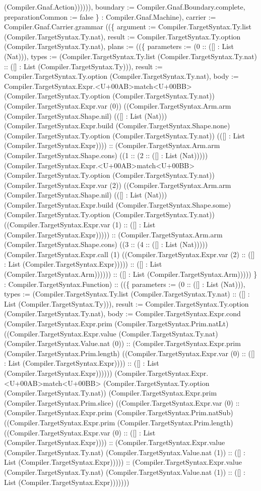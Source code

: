 \documentclass[11pt]{article}
\begin{document}
(Compiler.Gnaf.Action)))))), boundary := Compiler.Gnaf.Boundary.complete, preparationCommon := false \} : Compiler.Gnaf.Machine), carrier := Compiler.Gnaf.Carrier.grammar ((\{ argument := Compiler.TargetSyntax.Ty.list (Compiler.TargetSyntax.Ty.nat), result := Compiler.TargetSyntax.Ty.option (Compiler.TargetSyntax.Ty.nat), plans := ((\{ parameters := (0 :: ([] : List (Nat))), types := (Compiler.TargetSyntax.Ty.list (Compiler.TargetSyntax.Ty.nat) :: ([] : List (Compiler.TargetSyntax.Ty))), result := Compiler.TargetSyntax.Ty.option (Compiler.TargetSyntax.Ty.nat), body := Compiler.TargetSyntax.Expr.<U+00AB>match<U+00BB> (Compiler.TargetSyntax.Ty.option (Compiler.TargetSyntax.Ty.nat)) (Compiler.TargetSyntax.Expr.var (0)) ((Compiler.TargetSyntax.Arm.arm (Compiler.TargetSyntax.Shape.nil) (([] : List (Nat))) (Compiler.TargetSyntax.Expr.build (Compiler.TargetSyntax.Shape.none) (Compiler.TargetSyntax.Ty.option (Compiler.TargetSyntax.Ty.nat)) (([] : List (Compiler.TargetSyntax.Expr)))) :: (Compiler.TargetSyntax.Arm.arm (Compiler.TargetSyntax.Shape.cons) ((1 :: (2 :: ([] : List (Nat))))) (Compiler.TargetSyntax.Expr.<U+00AB>match<U+00BB> (Compiler.TargetSyntax.Ty.option (Compiler.TargetSyntax.Ty.nat)) (Compiler.TargetSyntax.Expr.var (2)) ((Compiler.TargetSyntax.Arm.arm (Compiler.TargetSyntax.Shape.nil) (([] : List (Nat))) (Compiler.TargetSyntax.Expr.build (Compiler.TargetSyntax.Shape.some) (Compiler.TargetSyntax.Ty.option (Compiler.TargetSyntax.Ty.nat)) ((Compiler.TargetSyntax.Expr.var (1) :: ([] : List (Compiler.TargetSyntax.Expr))))) :: (Compiler.TargetSyntax.Arm.arm (Compiler.TargetSyntax.Shape.cons) ((3 :: (4 :: ([] : List (Nat))))) (Compiler.TargetSyntax.Expr.call (1) ((Compiler.TargetSyntax.Expr.var (2) :: ([] : List (Compiler.TargetSyntax.Expr))))) :: ([] : List (Compiler.TargetSyntax.Arm)))))) :: ([] : List (Compiler.TargetSyntax.Arm))))) \} : Compiler.TargetSyntax.Function) :: ((\{ parameters := (0 :: ([] : List (Nat))), types := (Compiler.TargetSyntax.Ty.list (Compiler.TargetSyntax.Ty.nat) :: ([] : List (Compiler.TargetSyntax.Ty))), result := Compiler.TargetSyntax.Ty.option (Compiler.TargetSyntax.Ty.nat), body := Compiler.TargetSyntax.Expr.cond (Compiler.TargetSyntax.Expr.prim (Compiler.TargetSyntax.Prim.natLt) ((Compiler.TargetSyntax.Expr.value (Compiler.TargetSyntax.Ty.nat) (Compiler.TargetSyntax.Value.nat (0)) :: (Compiler.TargetSyntax.Expr.prim (Compiler.TargetSyntax.Prim.length) ((Compiler.TargetSyntax.Expr.var (0) :: ([] : List (Compiler.TargetSyntax.Expr)))) :: ([] : List (Compiler.TargetSyntax.Expr)))))) (Compiler.TargetSyntax.Expr.<U+00AB>match<U+00BB> (Compiler.TargetSyntax.Ty.option (Compiler.TargetSyntax.Ty.nat)) (Compiler.TargetSyntax.Expr.prim (Compiler.TargetSyntax.Prim.slice) ((Compiler.TargetSyntax.Expr.var (0) :: (Compiler.TargetSyntax.Expr.prim (Compiler.TargetSyntax.Prim.natSub) ((Compiler.TargetSyntax.Expr.prim (Compiler.TargetSyntax.Prim.length) ((Compiler.TargetSyntax.Expr.var (0) :: ([] : List (Compiler.TargetSyntax.Expr)))) :: (Compiler.TargetSyntax.Expr.value (Compiler.TargetSyntax.Ty.nat) (Compiler.TargetSyntax.Value.nat (1)) :: ([] : List (Compiler.TargetSyntax.Expr))))) :: (Compiler.TargetSyntax.Expr.value (Compiler.TargetSyntax.Ty.nat) (Compiler.TargetSyntax.Value.nat (1)) :: ([] : List (Compiler.TargetSyntax.Expr))))))) 
\end{document}
